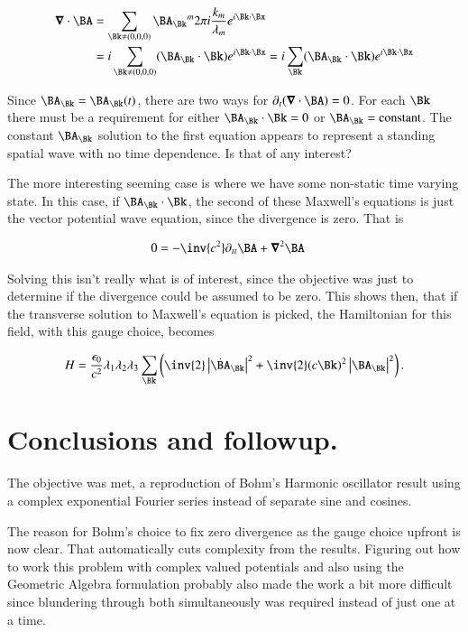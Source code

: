 \begin{align*}
\spacegrad \cdot \BA 
&=
\sum_{\Bk \ne (0,0,0)} {\BA_\Bk}^m 2 \pi i \frac{k_m}{\lambda_m} e^{i \Bk \cdot \Bx} \\
&=
i \sum_{\Bk \ne (0,0,0)} (\BA_\Bk \cdot \Bk) e^{i \Bk \cdot \Bx} 
=
i \sum_\Bk (\BA_\Bk \cdot \Bk) e^{i \Bk \cdot \Bx} 
\end{align*}

Since $\BA_\Bk = \BA_\Bk(t)$, there are two ways for $\partial_t (\spacegrad \cdot \BA) = 0$.  For each $\Bk$ there must be a requirement for either $\BA_\Bk \cdot \Bk = 0$ or $\BA_\Bk = \text{constant}$.  The constant $\BA_\Bk$ solution to the first equation appears to represent a standing spatial wave with no time dependence.  Is that of any interest?

The more interesting seeming case is where we have some non-static time varying state.  In this case, if $\BA_\Bk \cdot \Bk$, the second of these Maxwell's equations is just the vector potential wave equation, since the divergence is zero.  That is

\begin{align}\label{eqn:fourierMaxVac:50}
0 &= -\inv{c^2} \partial_{tt} \BA + \spacegrad^2 \BA 
\end{align}

Solving this isn't really what is of interest, since the objective was just to determine if the divergence could be assumed to be zero.  This shows then, that if the transverse solution to Maxwell's equation is picked, the Hamiltonian for this field, with this gauge choice, becomes

\begin{align}
\label{eqn:fourierMaxVac:17c}
H = 
\frac{\epsilon_0}{c^2} \lambda_1 \lambda_2 \lambda_3 \sum_\Bk
\left(
\inv{2} \Abs{\dot{\BA}_\Bk}^2
+
\inv{2} 
(c \Bk)^2 \Abs{\BA_\Bk}^2 
\right).
\end{align}

\section{Conclusions and followup.}

The objective was met, a reproduction of Bohm's Harmonic oscillator result using a complex exponential Fourier series instead of separate sine and cosines.

The reason for Bohm's choice to fix zero divergence as the gauge choice upfront is now clear.  That automatically cuts complexity from the results.  Figuring out how to work this problem with complex valued potentials and also using the Geometric Algebra formulation probably also made the work a bit more difficult since blundering through both simultaneously was required instead of just one at a time.

